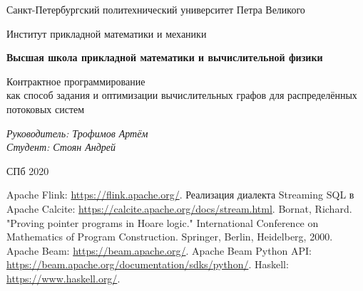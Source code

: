 \documentclass[a4paper,12pt]{article}
\begin{document}
\thispagestyle{empty}
\begin{center}
    Санкт-Петербургский политехнический университет Петра Великого

    Институт прикладной математики и механики

    \textbf{Высшая школа прикладной математики и вычислительной
    физики}
\end{center}
\vspace{13ex}

\begin{center}
    \vspace{16ex}
    \begin{spacing}{1.5}
        {\Large Контрактное программирование \\как способ задания и оптимизации вычислительных графов для распределённых потоковых систем}
    \end{spacing}
\end{center}
\vfill
\begin{flushright}
    \noindent
    \textit{Руководитель: Трофимов Артём} \\
    \textit{Студент: Стоян Андрей}
\end{flushright}
\vspace{5ex}
\begin{center}
    СПб 2020
\end{center}
\newpage

\tableofcontents
\newpage


\newpage

\newpage

\newpage

\newpage





\begin{thebibliography}{9}
     Apache Flink: \url{https://flink.apache.org/}.
     Реализация диалекта Streaming SQL в Apache Calcite: \url{https://calcite.apache.org/docs/stream.html}.
     Bornat, Richard. "Proving pointer programs in Hoare logic." International Conference on Mathematics of Program Construction. Springer, Berlin, Heidelberg, 2000.
     Apache Beam: \url{https://beam.apache.org/}.
     Apache Beam Python API: \url{https://beam.apache.org/documentation/sdks/python/}.
     Haskell: \url{https://www.haskell.org/}.
\end{thebibliography}
\end{document}
